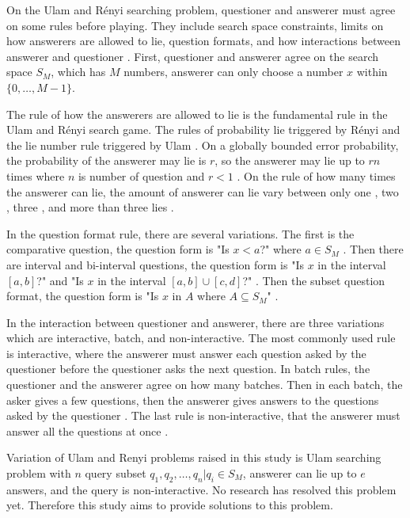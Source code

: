 \documentclass{TTP_DSL2006}
\begin{document}
On the Ulam and Rényi searching problem, questioner and answerer must agree on some rules before playing. They include search space constraints, limits on how answerers are allowed to lie, question formats, and how interactions between answerer and questioner \cite{Pelc2002}. First, questioner and answerer agree on the search space $S_M$, which has $M$ numbers, answerer can only choose a number $x$ within $\{0,\ldots,M-1\}$.

The rule of how the answerers are allowed to lie is the fundamental rule in the Ulam and Rényi search game. The rules of probability lie triggered by Rényi and the lie number rule triggered by Ulam \cite{Ulam1991}. On a globally bounded error probability, the probability of the answerer may lie is $r$, so the answerer may lie up to $rn$ times where $n$ is number of question and $r<1$ \cite{Dhagat1992}. On the rule of how many times the answerer can lie, the amount of answerer can lie vary between only one \cite{Ellis2008} \cite{Pelc1988}, two \cite{Cicalese2000}, three \cite{Negro1992}, and more than three lies \cite{Berlekamp1998} \cite{Deppe2004}.

In the question format rule, there are several variations. The first is the comparative question, the question form is "Is $x<a$?" where $a \in S_M$ \cite{Innes} \cite{Auletta1992}. Then there are interval and bi-interval questions, the question form is "Is $x$ in the interval $[a, b]$?" \cite{Peter2017} and "Is $x$ in the interval $[a, b] \cup [c, d]$?" \cite{Mundici1997}. Then the subset question format, the question form is "Is $x$ in $A$ where $A \subseteq S_M$" \cite{Katona} \cite{Macula1997}.

In the interaction between questioner and answerer, there are three variations which are interactive, batch, and non-interactive. The most commonly used rule is interactive, where the answerer must answer each question asked by the questioner before the questioner asks the next question. In batch rules, the questioner and the answerer agree on how many batches. Then in each batch, the asker gives a few questions, then the answerer gives answers to the questions asked by the questioner \cite{Cicalese2000}. The last rule is non-interactive, that the answerer must answer all the questions at once \cite{Macula1997}.

Variation of Ulam and Renyi problems raised in this study is Ulam searching problem with $n$ query subset ${q_1,q_2,\ldots,q_n} | q_i \in S_M$, answerer can lie up to $e$ answers, and the query is non-interactive. No research has resolved this problem yet. Therefore this study aims to provide solutions to this problem.
\end{document}
